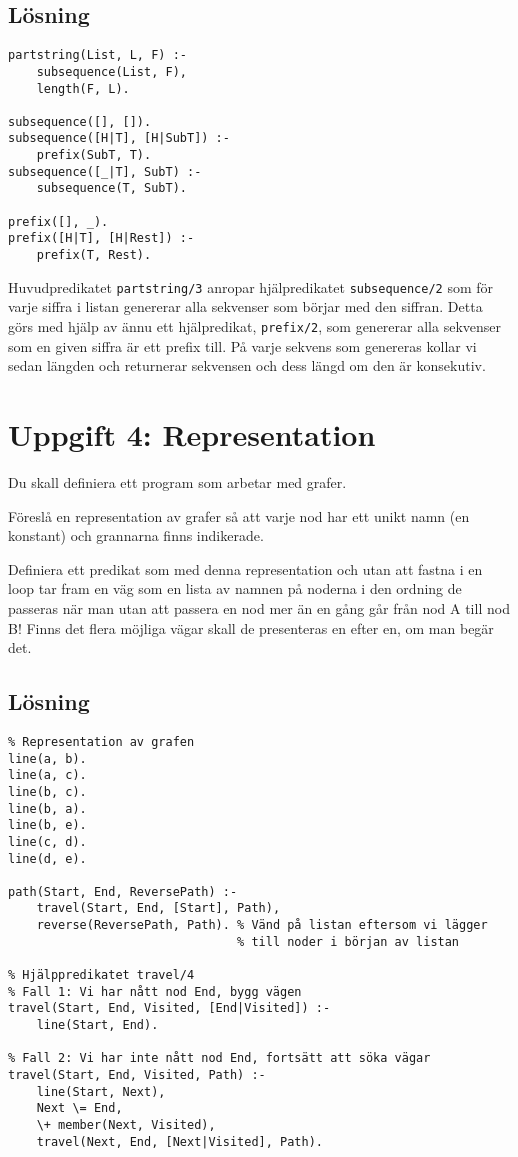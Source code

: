 \documentclass[12pt]{article}
\begin{document}
\subsection*{Lösning}

\begin{verbatim}
partstring(List, L, F) :-
    subsequence(List, F),
    length(F, L).

subsequence([], []).
subsequence([H|T], [H|SubT]) :-
    prefix(SubT, T).
subsequence([_|T], SubT) :-
    subsequence(T, SubT).

prefix([], _).
prefix([H|T], [H|Rest]) :-
    prefix(T, Rest).
\end{verbatim}

Huvudpredikatet \texttt{partstring/3} anropar hjälpredikatet \texttt{subsequence/2} som för varje siffra i listan genererar alla sekvenser som börjar med den siffran. Detta görs med hjälp av ännu ett hjälpredikat, \texttt{prefix/2}, som genererar alla sekvenser som en given siffra är ett prefix till. På varje sekvens som genereras kollar vi sedan längden och returnerar sekvensen och dess längd om den är konsekutiv.

\section*{Uppgift 4: Representation}

Du skall definiera ett program som arbetar med grafer.

Föreslå en representation av grafer så att varje nod har ett 
unikt namn (en konstant) och grannarna finns indikerade. 

Definiera ett predikat som med denna representation och utan 
att fastna i en loop tar fram en väg som en lista av namnen på 
noderna i den ordning de passeras när man utan att passera 
en nod mer än en gång går från nod A till nod B!
Finns det flera möjliga vägar skall de presenteras 
en efter en, om man begär det.

\subsection*{Lösning}

\begin{verbatim}
% Representation av grafen
line(a, b).
line(a, c).
line(b, c).
line(b, a).
line(b, e).
line(c, d).
line(d, e).

path(Start, End, ReversePath) :-
    travel(Start, End, [Start], Path),
    reverse(ReversePath, Path). % Vänd på listan eftersom vi lägger
                                % till noder i början av listan

% Hjälppredikatet travel/4
% Fall 1: Vi har nått nod End, bygg vägen
travel(Start, End, Visited, [End|Visited]) :-
    line(Start, End).

% Fall 2: Vi har inte nått nod End, fortsätt att söka vägar
travel(Start, End, Visited, Path) :- 
    line(Start, Next),
    Next \= End,
    \+ member(Next, Visited),
    travel(Next, End, [Next|Visited], Path).
\end{verbatim}
\end{document}
